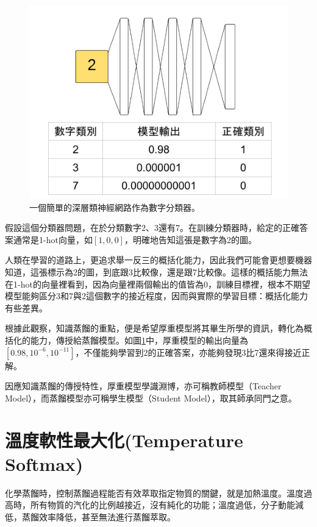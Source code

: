 \begin{figure}[!h]
\centering
\includegraphics[scale=0.30]{images/chap5_digit_classifier_example.png}
\caption{一個簡單的深層類神經網路作為數字分類器。}
\label{fig:chap5_digit_classifier_example}
\end{figure}

假設這個分類器問題，在於分類數字2、3還有7。在訓練分類器時，給定的正確答案通常是1-hot向量，如$[1, 0, 0]$，明確地告知這張是數字為2的圖。

人類在學習的道路上，更追求舉一反三的概括化能力，因此我們可能會更想要機器知道，這張標示為2的圖，到底跟3比較像，還是跟7比較像。這樣的概括能力無法在1-hot的向量裡看到，因為向量裡兩個輸出的值皆為0，訓練目標裡，根本不期望模型能夠區分3和7與2這個數字的接近程度，因而與實際的學習目標：概括化能力有些差異。

根據此觀察，知識蒸餾的重點，便是希望厚重模型將其畢生所學的資訊，轉化為概括化的能力，傳授給蒸餾模型。如圖\ref{fig:chap5_digit_classifier_example}中，厚重模型的輸出向量為$[0.98 , 10^{-6} , 10^{-11}]$，不僅能夠學習到2的正確答案，亦能夠發現3比7還來得接近正解。

因應知識蒸餾的傳授特性，厚重模型學識淵博，亦可稱教師模型（Teacher Model），而蒸餾模型亦可稱學生模型（Student Model），取其師承同門之意。

\section{溫度軟性最大化(Temperature Softmax)}

化學蒸餾時，控制蒸餾過程能否有效萃取指定物質的關鍵，就是加熱溫度。溫度過高時，所有物質的汽化的比例越接近，沒有純化的功能；溫度過低，分子動能減低，蒸餾效率降低，甚至無法進行蒸餾萃取。

